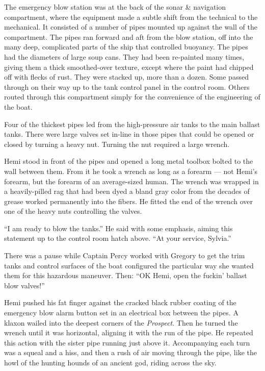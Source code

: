 \documentclass[
]{scrbook}
\begin{document}
The emergency blow station was at the back of the sonar \& navigation
compartment, where the equipment made a subtle shift from the technical
to the mechanical. It consisted of a number of pipes mounted up against
the wall of the compartment. The pipes ran forward and aft from the blow
station, off into the many deep, complicated parts of the ship that
controlled buoyancy. The pipes had the diameters of large soup cans.
They had been re-painted many times, giving them a thick smoothed-over
texture, except where the paint had chipped off with flecks of rust.
They were stacked up, more than a dozen. Some passed through on their
way up to the tank control panel in the control room. Others routed
through this compartment simply for the convenience of the engineering
of the boat.

Four of the thickest pipes led from the high-pressure air tanks to the
main ballast tanks. There were large valves set in-line in those pipes
that could be opened or closed by turning a heavy nut. Turning the nut
required a large wrench.

Hemi stood in front of the pipes and opened a long metal toolbox bolted
to the wall between them. From it he took a wrench as long as a forearm
--- not Hemi's forearm, but the forearm of an average-sized human. The
wrench was wrapped in a heavily-pilled rag that had been dyed a bland
gray color from the decades of grease worked permanently into the
fibers. He fitted the end of the wrench over one of the heavy nuts
controlling the valves.

``I am ready to blow the tanks.'' He said with some emphasis, aiming
this statement up to the control room hatch above. ``At your service,
Sylvia.''

There was a pause while Captain Percy worked with Gregory to get the
trim tanks and control surfaces of the boat configured the particular
way she wanted them for this hazardous maneuver. Then: ``OK Hemi, open
the fuckin' ballast blow valves!''

Hemi pushed his fat finger against the cracked black rubber coating of
the emergency blow alarm button set in an electrical box between the
pipes. A klaxon wailed into the deepest corners of the \emph{Prospect}.
Then he turned the wrench until it was horizontal, aligning it with the
run of the pipe. He repeated this action with the sister pipe running
just above it. Accompanying each turn was a squeal and a hiss, and then
a rush of air moving through the pipe, like the howl of the hunting
hounds of an ancient god, riding across the sky.
\end{document}
